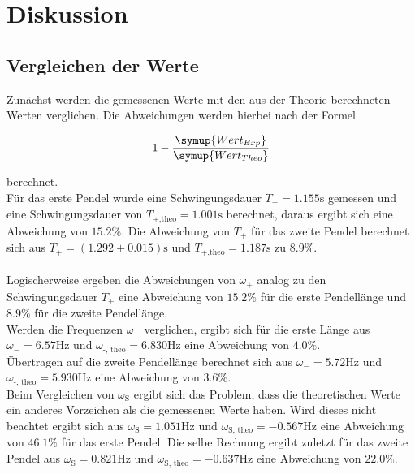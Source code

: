 \section{Diskussion}

    \subsection{Vergleichen der Werte}
    
        \noindent Zunächst werden die gemessenen Werte mit den aus der Theorie berechneten Werten verglichen. 
        Die Abweichungen werden hierbei nach der Formel

        \begin{equation*}
            1 - \frac{\symup{Wert_{Exp}}}{\symup{Wert_{Theo}}}
        \end{equation*}    

        \noindent berechnet.\\

        \noindent Für das erste Pendel wurde eine 
        Schwingungsdauer $T_+ = 1.155  \si{\s}$ gemessen und eine Schwingungsdauer von $T_{+\text{,theo}} = 1.001 \si{\s}$ berechnet,
        daraus ergibt sich eine Abweichung von $15.2  \%$.
        Die Abweichung von $T_+$ für das zweite Pendel berechnet sich aus $T_+ = (1.292 \pm 0.015) \si{\s}$ und 
        $T_{+\text{,theo}} = 1.187 \si{\s}$ zu $8.9  \%$.\\\\
        Logischerweise ergeben die Abweichungen von $\omega_+$ analog zu den Schwingungsdauer $T_+$ eine Abweichung von $15.2 \%$ 
        für die erste Pendellänge und $8.9  \%$ für die zweite Pendellänge.\\
        Werden die Frequenzen $\omega_-$ verglichen, ergibt sich für die erste Länge aus $\omega_{-} = 6.57 \si{\hertz}$ und
        $\omega_\text{-, theo} = 6.830 \si{\hertz}$ eine Abweichung von $ 4.0  \%$. \\
        Übertragen auf die zweite Pendellänge berechnet sich aus  $\omega_{-} = 5.72  \si{\hertz}$ und 
        $\omega_\text{-, theo} = 5.930  \si{\hertz}$ eine Abweichung von $ 3.6  \%$.\\
        Beim Vergleichen von $\omega_{\text{S}}$ ergibt sich das Problem, dass die theoretischen Werte ein anderes Vorzeichen als die gemessenen 
        Werte haben. Wird dieses nicht beachtet ergibt sich aus $\omega_{\text{S}}= 1.051 \si{\hertz}$ und 
        $\omega_\text{S, theo} = -0.567  \si{\hertz}$ eine Abweichung von $46.1  \%$ für das erste Pendel.
        Die selbe Rechnung ergibt zuletzt für das zweite Pendel aus $ \omega_{\text{S}}= 0.821  \si{\hertz}$ und 
        $\omega_\text{S, theo} = -0.637 \si{\hertz}$ eine Abweichung von $ 22.0  \%$.
       
